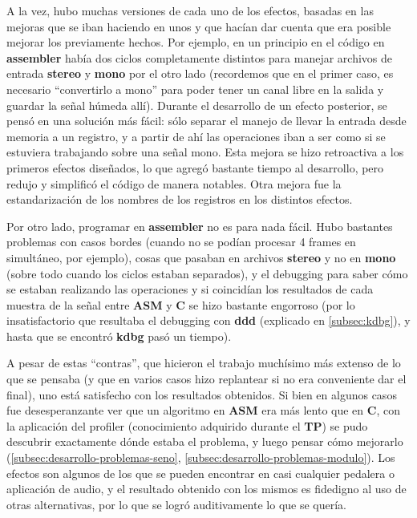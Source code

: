 A la vez, hubo muchas versiones de cada uno de los efectos, basadas en las mejoras que se iban haciendo en unos y que hacían dar cuenta que era posible mejorar los previamente hechos. Por ejemplo, en un principio en el código en \textbf{assembler} había dos ciclos completamente distintos para manejar archivos de entrada \textbf{stereo} y \textbf{mono} por el otro lado (recordemos que en el primer caso, es necesario ``convertirlo a mono'' para poder tener un canal libre en la salida y guardar la señal húmeda allí). Durante el desarrollo de un efecto posterior, se pensó en una solución más fácil: sólo separar el manejo de llevar la entrada desde memoria a un registro, y a partir de ahí las operaciones iban a ser como si se estuviera trabajando sobre una señal mono. Esta mejora se hizo retroactiva a los primeros efectos diseñados, lo que agregó bastante tiempo al desarrollo, pero redujo y simplificó el código de manera notables. Otra mejora fue la estandarización de los nombres de los registros en los distintos efectos.

Por otro lado, programar en \textbf{assembler} no es para nada fácil. Hubo bastantes problemas con casos bordes (cuando no se podían procesar 4 frames en simultáneo, por ejemplo), cosas que pasaban en archivos \textbf{stereo} y no en \textbf{mono} (sobre todo cuando los ciclos estaban separados), y el debugging para saber cómo se estaban realizando las operaciones y si coincidían los resultados de cada muestra de la señal entre \textbf{ASM} y \textbf{C} se hizo bastante engorroso (por lo insatisfactorio que resultaba el debugging con \textbf{ddd} (explicado en \ref{subsec:kdbg}), y hasta que se encontró \textbf{kdbg} pasó un tiempo).\vspace{\baselineskip}

A pesar de estas ``contras'', que hicieron el trabajo muchísimo más extenso de lo que se pensaba (y que en varios casos hizo replantear si no era conveniente dar el final), uno está satisfecho con los resultados obtenidos. Si bien en algunos casos fue desesperanzante ver que un algoritmo en \textbf{ASM} era más lento que en \textbf{C}, con la aplicación del profiler (conocimiento adquirido durante el \textbf{TP}) se pudo descubrir exactamente dónde estaba el problema, y luego pensar cómo mejorarlo (\ref{subsec:desarrollo-problemas-seno}, \ref{subsec:desarrollo-problemas-modulo}). Los efectos son algunos de los que se pueden encontrar en casi cualquier pedalera o aplicación de audio, y el resultado obtenido con los mismos es fidedigno al uso de otras alternativas, por lo que se logró auditivamente lo que se quería.


